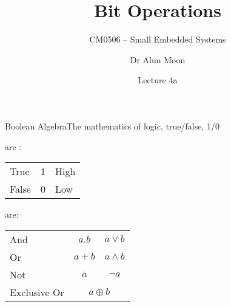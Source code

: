 \documentclass[svgnames,x11names]{beamer}
\title{Bit Operations}
\subtitle{CM0506 -- Small Embedded Systems}
\date{Lecture 4a}
\author{Dr Alun Moon}
\institute{Department of Computer and Information Science}
\begin{document}
\frame\maketitle

\begin{frame}{Boolean Algebra}{The mathematics of logic, true/false, 1/0}
\begin{description}[<+->]
\item[Values] are :\\[1ex]
\begin{tabular}{lll}\toprule
  True& 1 & High\\
  False & 0 & Low\\\bottomrule
\end{tabular}

\item[Operations] are:\\[1ex]
  \begin{tabular}{lcc}\toprule
    And & $a.b$ & $a\vee b$ \\
    Or  & $a+b$ & $a\wedge b$ \\
    Not & $\bar{a}$ & $\neg a$ \\
Exclusive Or & \multicolumn{2}{c}{$a\oplus b$}\\\bottomrule
  \end{tabular}
\end{description}
\end{frame}
\end{document}
